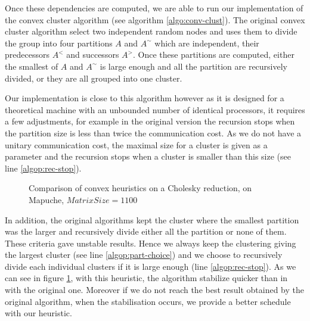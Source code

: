 \documentclass[10pt, conference, compsocconf,pdftex,dvipsnames]{IEEEtran}
\begin{document}
Once these dependencies are computed, we are able to run our implementation of
the convex cluster algorithm (see algorithm \ref{algo:conv-clust}). The
original convex cluster algorithm select two independent random nodes and uses
them to divide the group into four partitions $A$ and $A^{\sim}$ which are
independent, their predecessors $A^<$ and successors $A^>$. Once these
partitions are computed, either the smallest of $A$ and $A^{\sim}$ is large
enough and all the partition are recursively divided, or they are all grouped
into one cluster. 

Our implementation is close to this algorithm however as it is designed for a
theoretical machine with an unbounded number of identical processors, it
requires a few adjustments, for example in the original version the recursion
stops when the partition size is less than twice the communication cost. As we
do not have a unitary communication cost, the maximal size for a cluster is
given as a parameter and the recursion stops when a cluster is smaller than
this size (see line \ref{algop:rec-stop}). 

\begin{figure}[htb]
    \scalebox{0.65}{
        \centering
        
    }


    \caption{Comparison of convex heuristics on a Cholesky reduction, on
    Mapuche, $MatrixSize=1100$}
    \label{fig:Rdt}
\end{figure}

In addition, the original algorithms kept the cluster where the smallest
partition was the larger and recursively divide either all the partition or
none of them. These criteria gave unstable results. Hence we always keep the
clustering giving the largest cluster (see line \ref{algop:part-choice}) and
we choose to recursively divide each individual clusters if it is large enough
(line \ref{algop:rec-stop}). As we can see in figure \ref{fig:Rdt}, with this
heuristic, the algorithm stabilize quicker than in with the original one.
Moreover if we do not reach the best result obtained by the original
algorithm, when the stabilisation occurs, we provide a better schedule with
our heuristic.
\end{document}
